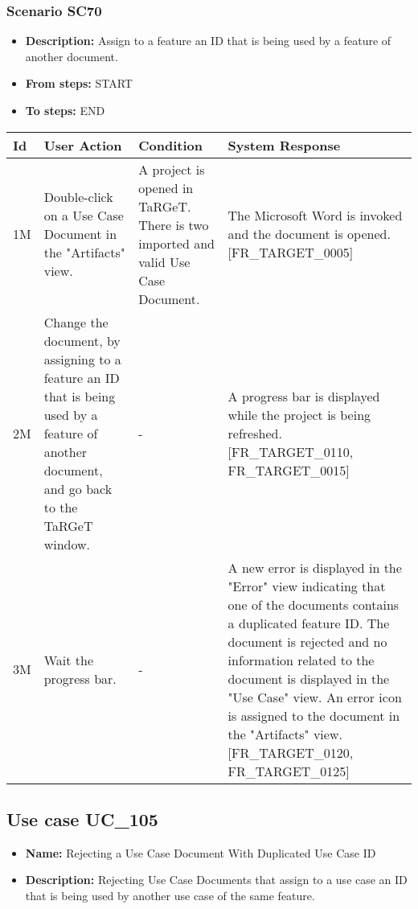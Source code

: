 \documentclass[a4paper,11pt]{article}
\newcommand{\bl}{\\ \hline}
\begin{document}
\subsubsection*{Scenario SC70}
\begin{itemize}
\item {\bf Description:} Assign to a feature an ID that is being used by a
					feature of another document.
\item {\bf From steps:} START
\item {\bf To steps:} END
\end{itemize}
\begin{tabular}{|p{0.4in}|p{1.5in}|p{1.5in}|p{1.5in}|}
\hline
Id & User Action & Condition & System Response \bl 
1M & Double-click on a Use Case Document in the "Artifacts"
						view. & A project is opened in TaRGeT. There is two imported and
						valid Use Case Document. & The Microsoft Word is invoked and the document is opened.
						[FR_TARGET_0005]\bl
2M & Change the document, by assigning to a feature an ID that
						is being used by a feature of another document, and go back to the
						TaRGeT window.  & - & A progress bar is displayed while the project is being
						refreshed. [FR_TARGET_0110, FR_TARGET_0015]\bl
3M & Wait the progress bar. & - & A new error is displayed in the "Error" view indicating
						that one of the documents contains a duplicated feature ID. The
						document is rejected and no information related to the document is
						displayed in the "Use Case" view. An error icon is assigned to the
						document in the "Artifacts" view. [FR_TARGET_0120, FR_TARGET_0125]
					\bl
\end{tabular}
\subsection*{Use case UC_105}
\begin{itemize}
\item {\bf Name: }Rejecting a Use Case Document With Duplicated Use Case ID
			
\item {\bf Description: }Rejecting Use Case Documents that assign to a use case
				an ID that is being used by another use case of the same feature.
			
\end{itemize}
\end{document}
